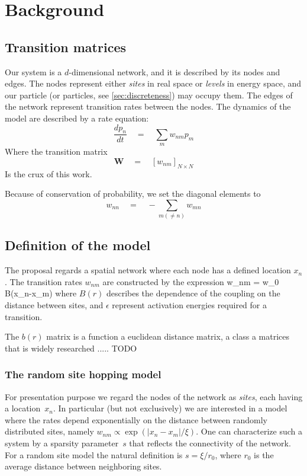 \chapter{Background}

 



\section{Transition matrices}

Our system is a $d$-dimensional network, and it is
described by its nodes and edges. The nodes represent 
either {\em sites} in real space or {\em levels} in energy space, 
and our particle (or particles, see \ref{sec:discreteness}) may
occupy them. The edges of the network represent transition rates 
between the nodes. The dynamics of the model are described by 
a rate equation:
\[
\frac{dp_n}{dt} \quad = \quad \sum_m w_{nm}p_m
\]
Where the transition matrix 
\[
\mathbf{W} \quad =  \quad \left[ w_{nm}\right]_{N\times N}
\]
Is the crux of this work.

Because of conservation of probability, we set the diagonal
elements to
\[ w_{nn}\quad = \quad -\sum_{m(\ne n)} w_{mn}\]


\section{Definition of the model}


The proposal regards a spatial network where each node
has a defined location $x_n$. The transition rates $w_{nm}$
are constructed by the expression
%
\beq
w_{nm} \quad = \quad w_0 B(x_n-x_m)
\eeq
%
where $B(r)$ describes the dependence of the coupling on the
distance between sites, and $\epsilon$ represent activation
energies required for a transition.


The $b(r)$ matrix is a function a euclidean distance matrix,
a class a matrices that is widely researched ..... TODO

\subsection{The random site hopping model} \label{sec:random_hopping}




For presentation purpose we regard the nodes of the network as {\em sites}, 
each having a location~$x_n$. In particular (but not exclusively) we are interested 
in a model where the rates depend exponentially on the distance 
between randomly distributed sites, namely $w_{nm}\propto \exp(|x_n-x_m|/\xi)$. 
One can characterize such a system by a sparsity parameter~$s$ 
that reflects the connectivity of the network. For a random site model
the natural definition is $s=\xi/r_0$, where $r_0$ is the average distance 
between neighboring sites. 

